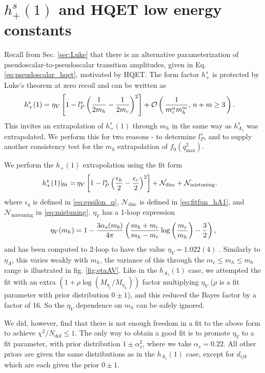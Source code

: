 \section{$h^s_+(1)$ and HQET low energy constants}

Recall from Sec. \ref{sec:Luke} that there is an alternative parameterization of pseudoscalar-to-pseudoscalar transition amplitudes, given in Eq. \eqref{eq:pseudoscalar_hqet}, motivated by HQET. The form factor $h^s_+$ is protected by Luke's theorem at zero recoil and can be written as
\begin{align}
  \label{eq:h+}
  &h^s_+(1) = \eta_V \left[ 1 - l^s_P \left( {1\over 2m_h} - {1\over 2m_c} \right)^2 \right] + \mathcal{O}\left( \, {1\over m_c^n m_h^m}, \, n+m\geq 3 \, \right).
\end{align}
This invites an extrapolation of $h^s_+(1)$ through $m_h$ in the same way as $h_{A_1}^s$ was extrapolated. We perform this for two reasons - to determine $l_P^s$, and to supply another consistency test for the $m_h$ extrapolation of $f_0(q^2_{\text{max}})$.

We perform the $h_+(1)$ extrapolation using the fit form
\begin{align}
  \label{eq:h+_fitform}
  h^s_+(1)|_{\text{fit}} =&\, \eta_V \left[ 1 - l^s_P \left( {\epsilon_h\over2} - {\epsilon_c\over 2} \right)^2 \right]
  + \mathcal{N}_{\text{disc}} + \mathcal{N}_{\text{mistuning}}.
\end{align}
where $\epsilon_q$ is defined in \eqref{eq:epsilon_q}, $\mathcal{N}_{\text{disc}}$ is defined in \eqref{eq:fitfun_hA1}, and $\mathcal{N}_{\text{mistuning}}$ in \eqref{eq:mistuning}. $\eta_V$ has a 1-loop expression \cite{PASCHALIS1983473}
\begin{align}
  \eta_V(m_h) = 1 - {3 \alpha_s(m_b) \over 4\pi} \left( {m_h+m_c\over m_h-m_c} \log\left({m_c\over m_h}\right) - {3\over 2} \right),
\end{align}
and has been computed to 2-loop to have the value $\eta_V = 1.022(4)$ \cite{PhysRevLett.76.4124}. Similarly to $\eta_A$, this varies weakly with $m_h$, the variance of this through the $m_c \leq m_h \leq m_b$ range is illustrated in fig. \ref{fig:etaAV}. Like in the $h_{A_1}(1)$ case, we attempted the fit with an extra $(1+\rho \log(M_{\eta_c}/M_{\eta_h}))$ factor multiplying $\eta_V$ ($\rho$ is a fit parameter with prior distribution $0\pm 1$), and this reduced the Bayes factor by a factor of 16. So the $\eta_V$ dependence on $m_h$ can be safely ignored.

We did, however, find that there is not enough freedom in a fit to the above form to achieve $\chi^2/N_{\text{dof}} \leq 1$. The only way to obtain a good fit is to promote $\eta_V$ to a fit parameter, with prior distribution $1\pm \alpha_s^2$, where we take $\alpha_s=0.22$. All other priors are given the same distributions as in the $h_{A_1}(1)$ case, except for $d_{ijk}$ which are each given the prior $0\pm 1$.

